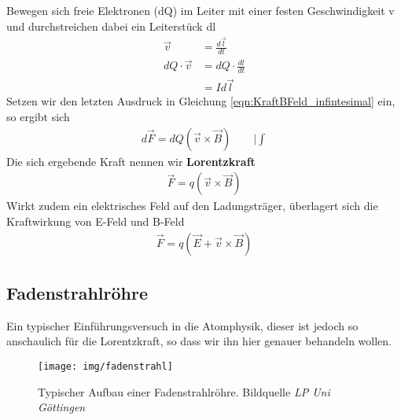 Bewegen sich freie Elektronen (dQ) im Leiter mit einer festen Geschwindigkeit v und durchstreichen dabei ein Leiterstück dl
\begin{align*}
\vec{v }			&= \frac{d\vec{l}}{dt}\\
dQ \cdot \vec{v} 	&= dQ  \cdot \frac{dl}{dt} \\
			&= I d\vec{l}
\end{align*}
Setzen wir den letzten Ausdruck in Gleichung \ref{eqn:KraftBFeld_infintesimal} ein, so ergibt sich 
\begin{align*}
d\vec{F} = dQ \left( \vec{v} \times \vec{B} \right) \qquad \bigg| \int
\end{align*} Die sich ergebende Kraft nennen wir \textbf{Lorentzkraft}
\begin{align} \label{eqn:Lorentzkraft}
\vec{F} = q \left( \vec{v} \times \vec{B} \right)
\end{align}
Wirkt zudem ein elektrisches Feld auf den Ladungsträger, überlagert sich die Kraftwirkung von E-Feld und B-Feld
\begin{align} \label{eqn:Lorentzkraft E-Feld}
\vec{F} = q \left( \vec{E} + \vec{v}  \times \vec{B}\right)
\end{align}
\subsection{Fadenstrahlröhre}
Ein typischer Einführungsversuch in die Atomphysik, dieser ist jedoch so anschaulich für die Lorentzkraft, so dass wir ihn hier genauer behandeln wollen.

\begin{figure}\begin{center}
\texttt{[image: img/fadenstrahl]}\end{center}
\caption{Typischer Aufbau einer Fadenstrahlröhre. Bildquelle \textit{LP Uni Göttingen}}
\label{pic:Fadenstrahlröhre}
\end{figure}

